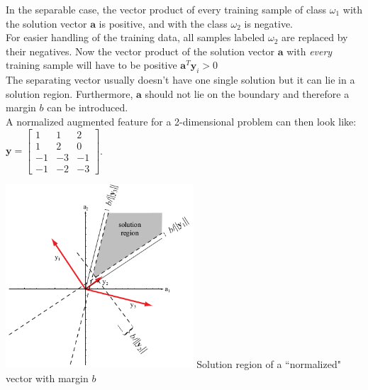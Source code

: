     \begin{minipage}{11cm}
    
    In the separable case, the vector product of every training sample of class $\omega_1$ with the solution
    vector $\bm a$ is positive, and with the class $\omega_2$ is negative.\\
    For easier handling of the training data, all samples labeled $\omega_2$ are replaced by their negatives.
    Now the vector product of the solution vector $\bm a$ with \emph{every} training sample will have to be positive 
    $\bm a^T \bm y_i  > 0$ \\
    
    The separating vector usually doesn't have one single solution but it can lie in a solution
    region. Furthermore, $\bm a$ should not lie on the boundary and therefore a margin $b$
    can be introduced. \\
        
    A normalized augmented feature for a 2-dimensional problem can then look like:
    $\bm y = \begin{bmatrix}
      1 & 1 & 2\\
      1 & 2 & 0\\
      -1 & -3 & -1\\
      -1 & -2 & -3
    \end{bmatrix}$.
    \end{minipage}
    \hspace{5mm}
    \begin{minipage}{7cm}
    	 \includegraphics[width=7cm]{./images/solutionRegionWithMargin.png}
    	 Solution region of a ``normalized" vector with margin $b$
 	\end{minipage}
    
